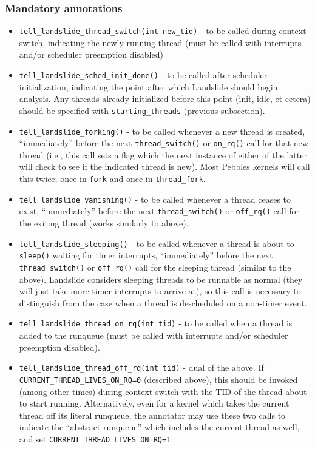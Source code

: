 \subsubsection{Mandatory annotations}

\begin{itemize}
	\item {\tt tell\_landslide\_thread\_switch(int new\_tid)} - to be called during context switch, indicating the newly-running thread
		(must be called with interrupts and/or scheduler preemption disabled)
	\item {\tt tell\_landslide\_sched\_init\_done()} - to be called after scheduler initialization,
		indicating the point after which Landslide should begin analysis.
		Any threads already initialized before this point (init, idle, et cetera) should be specified with {\tt starting\_threads} (previous subsection).
	\item {\tt tell\_landslide\_forking()} - to be called whenever a new thread is created,
		``immediately'' before the next {\tt thread\_switch()} or {\tt on\_rq()} call for that new thread (i.e., this call sets a flag which the next instance of either of the latter will check to see if the indicated thread is new).
		Most Pebbles kernels will call this twice; once in {\tt fork} and once in {\tt thread\_fork}.
	\item {\tt tell\_landslide\_vanishing()} - to be called whenever a thread ceases to exist,
		``immediately'' before the next {\tt thread\_switch()} or {\tt off\_rq()} call for the exiting thread
		(works similarly to above).
	\item {\tt tell\_landslide\_sleeping()} - to be called whenever a thread is about to {\tt sleep()} waiting for timer interrupts,
		``immediately'' before the next {\tt thread\_switch()} or {\tt off\_rq()} call for the sleeping thread
		(similar to the above).
		Landslide considers sleeping threads to be runnable as normal (they will just take more timer interrupts to arrive at),
		so this call is necessary to distinguish from the case when a thread is descheduled on a non-timer event.
	\item {\tt tell\_landslide\_thread\_on\_rq(int tid)} - to be called when a thread is added to the runqueue
		(must be called with interrupts and/or scheduler preemption disabled).
	\item {\tt tell\_landslide\_thread\_off\_rq(int tid)} - dual of the above.
		If {\tt CURRENT\_THREAD\_\allowbreak{}LIVES\_ON\_RQ=0} (described above), this should be invoked (among other times) during context switch with the TID of the thread about to start running.
		Alternatively, %
		even for a kernel which takes the current thread off its literal runqueue,
		the annotator may use these two calls to indicate the ``abstract runqueue'' which includes the current thread as well,
		and set {\tt CURRENT\_THREAD\_LIVES\_ON\_RQ=1}.
\end{itemize}

